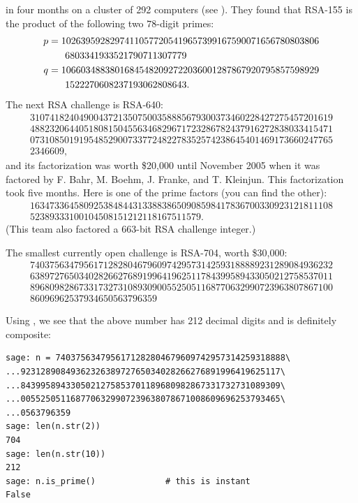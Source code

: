 in four months on a cluster of 292 computers (see \cite{rsa155}).
They found that RSA-155 is the product of the following two
$78$-digit primes:
\begin{align*}
p &= 10263959282974110577205419657399167590071656780803806\\
  &\hspace{4ex} 6803341933521790711307779\\
q &= 10660348838016845482092722036001287867920795857598929\\
  &\hspace{4ex} 1522270608237193062808643.
\end{align*}
The next RSA challenge is RSA-640:
$$
\begin{array}{l}
31074182404900437213507500358885679300373460228427275457201619\\
48823206440518081504556346829671723286782437916272838033415471\\
07310850191954852900733772482278352574238645401469173660247765\\
2346609,
\end{array}
$$
and its factorization was worth \$20,000 until
November 2005 when it was factored by F. Bahr, M. Boehm, J. Franke,
and T. Kleinjun.  This factorization took five months.  Here is
one of the prime factors (you can find the other):
$$
\begin{array}{l}
16347336458092538484431338838650908598417836700330923121811108\\
52389333100104508151212118167511579.
\end{array}
$$
(This team also factored a 663-bit RSA challenge integer.)

The smallest currently open challenge is RSA-704, worth \$30,000:
$$
\begin{array}{l}
74037563479561712828046796097429573142593188889231289084936232\\
63897276503402826627689199641962511784399589433050212758537011\\
89680982867331732731089309005525051168770632990723963807867100\\
86096962537934650563796359
\end{array}
$$
\begin{sg}
Using \sage, we see that the above number has 212 decimal digits
and is definitely composite:
\begin{verbatim}
sage: n = 7403756347956171282804679609742957314259318888\
...9231289084936232638972765034028266276891996419625117\
...8439958943305021275853701189680982867331732731089309\
...0055250511687706329907239638078671008609696253793465\
...0563796359
sage: len(n.str(2))
704
sage: len(n.str(10))
212
sage: n.is_prime()              # this is instant
False
\end{verbatim}
\end{sg}

